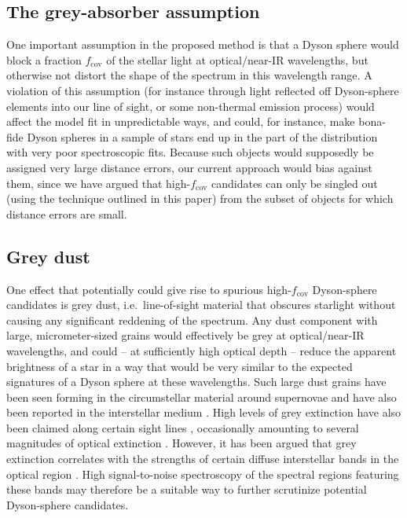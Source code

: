 \documentclass[twocolumn]{aastex6}
\begin{document}
\subsection{The grey-absorber assumption}
One important assumption in the proposed method is that a Dyson sphere would block a fraction $f_\mathrm{cov}$ of the stellar light at optical/near-IR wavelengths, but otherwise not distort the shape of the spectrum in this wavelength range. A violation of this assumption (for instance through light reflected off Dyson-sphere elements into our line of sight, or some non-thermal emission process) would affect the model fit in unpredictable ways, and could, for instance, make bona-fide Dyson spheres in a sample of stars end up in the part of the distribution with very poor spectroscopic fits. Because such objects would supposedly be assigned very large distance errors, our current approach would bias against them, since we have argued that high-$f_\mathrm{cov}$ candidates can only be singled out (using the technique outlined in this paper) from the subset of objects for which distance errors are small.

\subsection{Grey dust}
One effect that potentially could give rise to spurious high-$f_\mathrm{cov}$ Dyson-sphere candidates is grey dust, i.e.\ line-of-sight material that obscures starlight without causing any significant reddening of the spectrum. Any dust component with large, micrometer-sized grains would effectively be grey at optical/near-IR wavelengths, and could -- at sufficiently high optical depth -- reduce the apparent brightness of a star in a way that would be very similar to the expected signatures of a Dyson sphere at these wavelengths. Such large dust grains have been seen forming in the circumstellar material around supernovae \citep{Gall14,Nielsen18} and have also been reported in the interstellar medium \citep[e.g.][]{Wang15}. High levels of grey extinction have also been claimed along certain sight lines \citep[][]{Gorbikov10}, occasionally amounting to several magnitudes of optical extinction \citep[e.g.][]{Skorzynski03,Krelowski16}. However, it has been argued that grey extinction correlates with the strengths of certain diffuse interstellar bands in the optical region \citep[e.g.][]{Skorzynski03}. High signal-to-noise spectroscopy of the spectral regions featuring these bands may therefore be a suitable way to further scrutinize potential Dyson-sphere candidates. 
\end{document}
